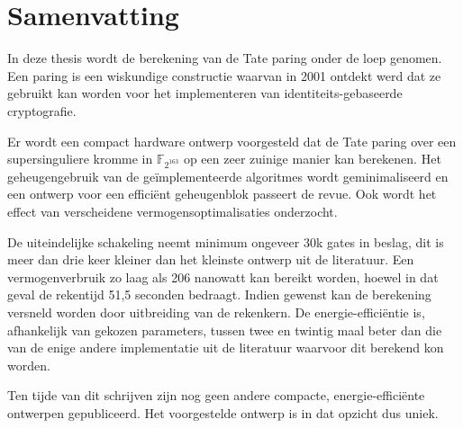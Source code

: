 \chapter*{Samenvatting}

In deze thesis wordt de berekening van de Tate paring onder de loep genomen. Een paring is een wiskundige constructie waarvan in 2001 ontdekt werd dat ze gebruikt kan worden voor het implementeren van identiteits-gebaseerde cryptografie.

Er wordt een compact hardware ontwerp voorgesteld dat de Tate paring over een supersinguliere kromme in $\mathbb{F}_{2^{163}}$ op een zeer zuinige manier kan berekenen. Het geheugengebruik van de ge\"implementeerde algoritmes wordt geminimaliseerd en een ontwerp voor een effici\"ent geheugenblok passeert de revue. Ook wordt het effect van verscheidene vermogensoptimalisaties onderzocht.

De uiteindelijke schakeling neemt minimum ongeveer 30k gates in beslag, dit is meer dan drie keer kleiner dan het kleinste ontwerp uit de literatuur. Een vermogenverbruik zo laag als 206 nanowatt kan bereikt worden, hoewel in dat geval de rekentijd 51,5 seconden bedraagt. Indien gewenst kan de berekening versneld worden door uitbreiding van de rekenkern. De energie-effici\"entie is, afhankelijk van gekozen parameters, tussen twee en twintig maal beter dan die van de enige andere implementatie uit de literatuur waarvoor dit berekend kon worden.

Ten tijde van dit schrijven zijn nog geen andere compacte, energie-effici\"ente ontwerpen gepubliceerd. Het voorgestelde ontwerp is in dat opzicht dus uniek.
